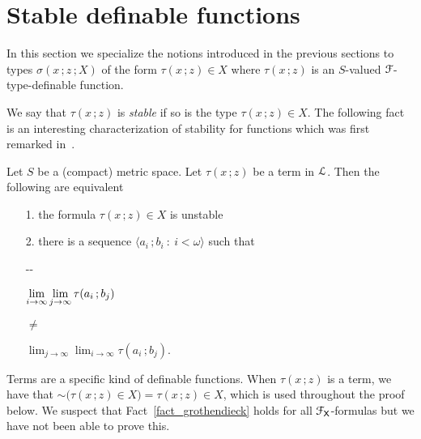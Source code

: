 \section{Stable definable functions}
\def\medrel#1{\parbox{5ex}{\hfil $#1$}}
\def\ceq#1#2#3{\parbox[t]{28ex}{$\displaystyle #1$}\medrel{#2}{$\displaystyle #3$}}

In this section we specialize the notions introduced in the previous sections to types $\sigma(x\,;z\,;X)$ of the form $\tau(x\,;z)\in X$ where $\tau(x\,;z)$ is an $S$-valued ${\EuScript F}$-type-definable function.

We say that $\tau(x\,;z)$ is \emph{stable\/} if so is the type $\tau(x\,;z)\in X$.
The following fact is an interesting characterization of stability for functions which was first remarked in~\cite{B}.

\begin{fact}\label{fact_grothendieck}
  Let $S$ be a (compact) metric space.
  Let $\tau(x\,;z)$ be a term in ${\EuScript L}$.
  Then the following are equivalent
  \begin{itemize}
    \item [1.] the formula $\tau(x\,;z)\in X$ is unstable
    \item [2.] there is a sequence $\langle a_i\,;b_i\ :\ i<\omega\rangle$ such that\smallskip
    
    \noindent\kern-\kern-
    \ceq{\hfill \lim_{i\to\infty}\lim_{j\to\infty}\tau(a_i\,;b_j)}{\neq}{\lim_{j\to\infty}\lim_{i\to\infty}\tau(a_i\,;b_j).}

    



  \end{itemize}
\end{fact}  
  Terms are a specific kind of definable functions.
  When $\tau(x\,;z)$ is a term, we have that ${\sim}\big(\tau(x\,;z)\in X\big)=\tau(x\,;z)\in X$, which is used throughout the proof below.
  We suspect that Fact~\ref{fact_grothendieck} holds for all ${\EuScript F}_{\sf X}$-formulas but we have not been able to prove this.


